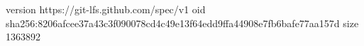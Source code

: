 version https://git-lfs.github.com/spec/v1
oid sha256:8206afcee37a43c3f090078cd4c49e13f64edd9ffa44908e7fb6bafe77aa157d
size 1363892
